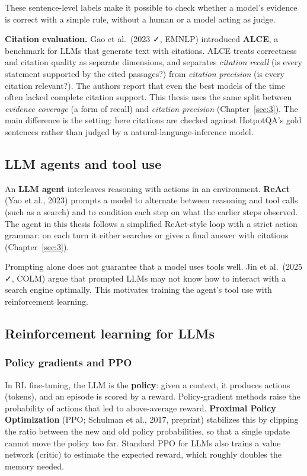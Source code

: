 These sentence-level labels make it possible to check whether a model's
evidence is correct with a simple rule, without a human or a model
acting as judge.

\textbf{Citation evaluation.} Gao et al.~(2023 ✓, EMNLP) introduced
\textbf{ALCE}, a benchmark for LLMs that generate text with citations.
ALCE treats correctness and citation quality as separate dimensions, and
separates \emph{citation recall} (is every statement supported by the
cited passages?) from \emph{citation precision} (is every citation
relevant?). The authors report that even the best models of the time
often lacked complete citation support. This thesis uses the same split
between \emph{evidence coverage} (a form of recall) and \emph{citation
precision} (Chapter~\ref{sec:3}). The main difference is the setting:
here citations are checked against HotpotQA's gold sentences rather than
judged by a natural-language-inference model.

\subsection{LLM agents and tool use}\label{sec:2.4}

An \textbf{LLM agent} interleaves reasoning with actions in an
environment. \textbf{ReAct} (Yao et al., 2023) prompts a model to
alternate between reasoning and tool calls (such as a search) and to
condition each step on what the earlier steps observed. The agent in
this thesis follows a simplified ReAct-style loop with a strict action
grammar: on each turn it either searches or gives a final answer with
citations (Chapter~\ref{sec:3}).

Prompting alone does not guarantee that a model uses tools well. Jin et
al.~(2025 ✓, COLM) argue that prompted LLMs may not know how to interact
with a search engine optimally. This motivates training the agent's tool
use with reinforcement learning.

\subsection{Reinforcement learning for LLMs}\label{sec:2.5}

\subsubsection{Policy gradients and PPO}\label{sec:2.5.1}

In RL fine-tuning, the LLM is the \textbf{policy}: given a context, it
produces actions (tokens), and an episode is scored by a reward.
Policy-gradient methods raise the probability of actions that led to
above-average reward. \textbf{Proximal Policy Optimization} (PPO;
Schulman et al., 2017, preprint) stabilizes this by clipping the ratio
between the new and old policy probabilities, so that a single update
cannot move the policy too far. Standard PPO for LLMs also trains a
value network (critic) to estimate the expected reward, which roughly
doubles the memory needed.

